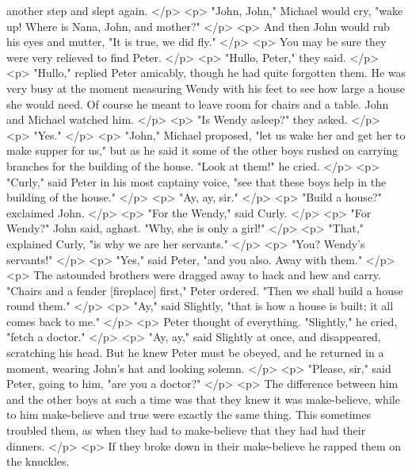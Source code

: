       another step and slept again.
    </p>
    <p>
      "John, John," Michael would cry, "wake up! Where is Nana, John, and
      mother?"
    </p>
    <p>
      And then John would rub his eyes and mutter, "It is true, we did fly."
    </p>
    <p>
      You may be sure they were very relieved to find Peter.
    </p>
    <p>
      "Hullo, Peter," they said.
    </p>
    <p>
      "Hullo," replied Peter amicably, though he had quite forgotten them. He
      was very busy at the moment measuring Wendy with his feet to see how large
      a house she would need. Of course he meant to leave room for chairs and a
      table. John and Michael watched him.
    </p>
    <p>
      "Is Wendy asleep?" they asked.
    </p>
    <p>
      "Yes."
    </p>
    <p>
      "John," Michael proposed, "let us wake her and get her to make supper for
      us," but as he said it some of the other boys rushed on carrying branches
      for the building of the house. "Look at them!" he cried.
    </p>
    <p>
      "Curly," said Peter in his most captainy voice, "see that these boys help
      in the building of the house."
    </p>
    <p>
      "Ay, ay, sir."
    </p>
    <p>
      "Build a house?" exclaimed John.
    </p>
    <p>
      "For the Wendy," said Curly.
    </p>
    <p>
      "For Wendy?" John said, aghast. "Why, she is only a girl!"
    </p>
    <p>
      "That," explained Curly, "is why we are her servants."
    </p>
    <p>
      "You? Wendy's servants!"
    </p>
    <p>
      "Yes," said Peter, "and you also. Away with them."
    </p>
    <p>
      The astounded brothers were dragged away to hack and hew and carry.
      "Chairs and a fender [fireplace] first," Peter ordered. "Then we shall
      build a house round them."
    </p>
    <p>
      "Ay," said Slightly, "that is how a house is built; it all comes back to
      me."
    </p>
    <p>
      Peter thought of everything. "Slightly," he cried, "fetch a doctor."
    </p>
    <p>
      "Ay, ay," said Slightly at once, and disappeared, scratching his head. But
      he knew Peter must be obeyed, and he returned in a moment, wearing John's
      hat and looking solemn.
    </p>
    <p>
      "Please, sir," said Peter, going to him, "are you a doctor?"
    </p>
    <p>
      The difference between him and the other boys at such a time was that they
      knew it was make-believe, while to him make-believe and true were exactly
      the same thing. This sometimes troubled them, as when they had to
      make-believe that they had had their dinners.
    </p>
    <p>
      If they broke down in their make-believe he rapped them on the knuckles.
